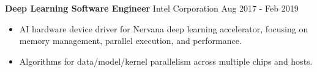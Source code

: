 \textbf{Deep Learning Software Engineer}  Intel Corporation \hfill Aug 2017 - Feb 2019

\begin{itemize} \itemsep -2pt

\item AI hardware device driver for Nervana deep learning accelerator, focusing
      on memory management, parallel execution, and performance.

\item Algorithms for data/model/kernel parallelism
      across multiple chips and hosts.


\end{itemize}
